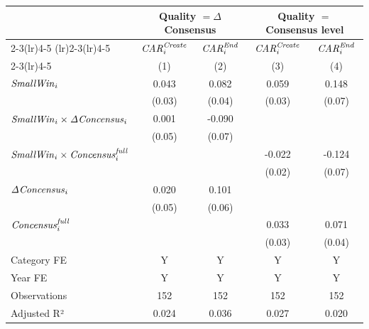 {
\def\sym#1{\ifmmode^{#1}\else\(^{#1}\)\fi}
\begin{tabular}{l*{4}{c}}
\toprule
                    &\multicolumn{2}{c}{Quality $=\Delta$ Consensus}&\multicolumn{2}{c}{Quality $=$ Consensus level}\\\cmidrule(lr){2-3}\cmidrule(lr){4-5}
\cmidrule(lr){2-3}\cmidrule(lr){4-5} & \multicolumn{1}{c}{${\it CAR}^{\it Create}_{i}$} & \multicolumn{1}{c}{${\it CAR}^{\it End}_{i}$} & \multicolumn{1}{c}{${\it CAR}^{\it Create}_{i}$} & \multicolumn{1}{c}{${\it CAR}^{\it End}_{i}$} \\ \cmidrule(lr){2-3}\cmidrule(lr){4-5} & \multicolumn{1}{c}{(1)} & \multicolumn{1}{c}{(2)} & \multicolumn{1}{c}{(3)} & \multicolumn{1}{c}{(4)} \\ \midrule
${\it Small Win}_{i}$&       0.043         &       0.082         &       0.059         &       0.148         \\
                    &      (0.03)         &      (0.04)         &      (0.03)         &      (0.07)         \\
${\it Small Win}_{i} \times {\it \Delta Concensus}_{i}$&       0.001         &      -0.090         &                     &                     \\
                    &      (0.05)         &      (0.07)         &                     &                     \\
${\it Small Win}_{i} \times {\it Concensus}^{\it full}_{i}$&                     &                     &      -0.022         &      -0.124         \\
                    &                     &                     &      (0.02)         &      (0.07)         \\
${\it \Delta Concensus}_{i}$&       0.020         &       0.101         &                     &                     \\
                    &      (0.05)         &      (0.06)         &                     &                     \\
${\it Concensus}^{\it full}_{i}$&                     &                     &       0.033         &       0.071         \\
                    &                     &                     &      (0.03)         &      (0.04)         \\
\midrule
Category FE         &           Y         &           Y         &           Y         &           Y         \\
Year FE             &           Y         &           Y         &           Y         &           Y         \\
Observations        &         152         &         152         &         152         &         152         \\
Adjusted R²         &       0.024         &       0.036         &       0.027         &       0.020         \\
\bottomrule
\end{tabular}
}
